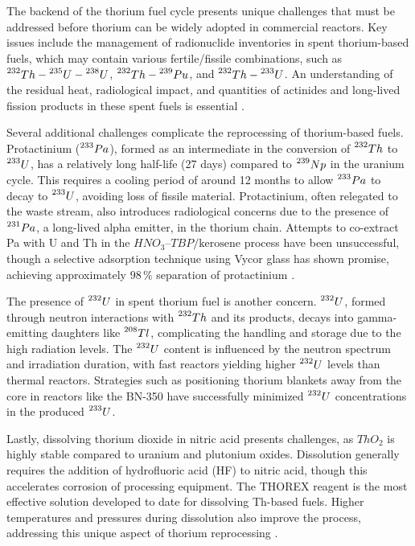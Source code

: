 The backend of the thorium fuel cycle presents unique challenges that must be addressed before thorium can be widely adopted in commercial reactors. Key issues include the management of radionuclide inventories in spent thorium-based fuels, which may contain various fertile/fissile combinations, such as \(\prescript{232}{}{Th}-\prescript{235}{}{U}-\prescript{238}{}{U}\), \(\prescript{232}{}{Th}-\prescript{239}{}{Pu}\), and \(\prescript{232}{}{Th}-\prescript{233}{}{U}\). An understanding of the residual heat, radiological impact, and quantities of actinides and long-lived fission products in these spent fuels is essential \cite{IAEA_Th_Potential}.

Several additional challenges complicate the reprocessing of thorium-based fuels. Protactinium (\(\prescript{233}{}{Pa}\)), formed as an intermediate in the conversion of \(\prescript{232}{}{Th}\) to \(\prescript{233}{}{U}\), has a relatively long half-life (27 days) compared to \(\prescript{239}{}{Np}\) in the uranium cycle. This requires a cooling period of around 12 months to allow \(\prescript{233}{}{Pa}\) to decay to \(\prescript{233}{}{U}\), avoiding loss of fissile material. Protactinium, often relegated to the waste stream, also introduces radiological concerns due to the presence of \(\prescript{231}{}{Pa}\), a long-lived alpha emitter, in the thorium chain. Attempts to co-extract Pa with U and Th in the \(HNO_3–TBP/\text{kerosene}\) process have been unsuccessful, though a selective adsorption technique using Vycor glass has shown promise, achieving approximately \(98 \, \%\) separation of protactinium \cite{IAEA_Th_Potential}.

The presence of \(\prescript{232}{}{U}\) in spent thorium fuel is another concern. \(\prescript{232}{}{U}\), formed through neutron interactions with \(\prescript{232}{}{Th}\) and its products, decays into gamma-emitting daughters like \(\prescript{208}{}{Tl}\), complicating the handling and storage due to the high radiation levels. The \(\prescript{232}{}{U}\) content is influenced by the neutron spectrum and irradiation duration, with fast reactors yielding higher \(\prescript{232}{}{U}\) levels than thermal reactors. Strategies such as positioning thorium blankets away from the core in reactors like the BN-350 have successfully minimized \(\prescript{232}{}{U}\) concentrations in the produced \(\prescript{233}{}{U}\).

Lastly, dissolving thorium dioxide in nitric acid presents challenges, as \(ThO_2\) is highly stable compared to uranium and plutonium oxides. Dissolution generally requires the addition of hydrofluoric acid (HF) to nitric acid, though this accelerates corrosion of processing equipment. The THOREX reagent is the most effective solution developed to date for dissolving Th-based fuels. Higher temperatures and pressures during dissolution also improve the process, addressing this unique aspect of thorium reprocessing \cite{IAEA_Th_Potential}.

